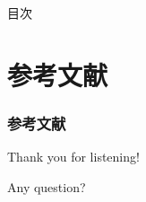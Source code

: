 \begin{frame}{目次}
  \tableofcontents
\end{frame}

\section*{参考文献}
\begin{frame}
  \frametitle{参考文献}

  \nocite{*}
  
  
\end{frame}

\begin{frame}
  \centering
  {\Huge Thank you for listening!}
  
  {\Huge Any question?}
\end{frame}



